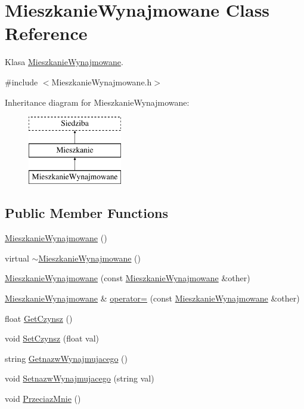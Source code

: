 \hypertarget{class_mieszkanie_wynajmowane}{}\section{Mieszkanie\+Wynajmowane Class Reference}
\label{class_mieszkanie_wynajmowane}


Klasa \hyperlink{class_mieszkanie_wynajmowane}{Mieszkanie\+Wynajmowane}.  




{\ttfamily \#include $<$Mieszkanie\+Wynajmowane.\+h$>$}

Inheritance diagram for Mieszkanie\+Wynajmowane\+:\begin{figure}[H]
\begin{center}
\leavevmode
\includegraphics[height=3.000000cm]{class_mieszkanie_wynajmowane}
\end{center}
\end{figure}
\subsection*{Public Member Functions}
\begin{DoxyCompactItemize}
\item 
\hyperlink{class_mieszkanie_wynajmowane_a8f23bf351540b25870d8816097e49c79}{Mieszkanie\+Wynajmowane} ()
\item 
virtual \hyperlink{class_mieszkanie_wynajmowane_ac08918efc1caebf86cb3eb54a8b14654}{$\sim$\+Mieszkanie\+Wynajmowane} ()
\item 
\hyperlink{class_mieszkanie_wynajmowane_a5f45599654f50e91e39f655aea84ccc3}{Mieszkanie\+Wynajmowane} (const \hyperlink{class_mieszkanie_wynajmowane}{Mieszkanie\+Wynajmowane} \&other)
\item 
\hyperlink{class_mieszkanie_wynajmowane}{Mieszkanie\+Wynajmowane} \& \hyperlink{class_mieszkanie_wynajmowane_a41c2c74090f7902b1277b5ec1b6fea4b}{operator=} (const \hyperlink{class_mieszkanie_wynajmowane}{Mieszkanie\+Wynajmowane} \&other)
\item 
float \hyperlink{class_mieszkanie_wynajmowane_af74eb718c87bc697522c3006d153464f}{Get\+Czynsz} ()
\item 
void \hyperlink{class_mieszkanie_wynajmowane_a54744a366a938cab96ae6e542e1770be}{Set\+Czynsz} (float val)
\item 
string \hyperlink{class_mieszkanie_wynajmowane_a8bdb7570f577836e8cf443ecccb23476}{Getnazw\+Wynajmujacego} ()
\item 
void \hyperlink{class_mieszkanie_wynajmowane_a964628ec1b2f577e7ea7c8de51b9426f}{Setnazw\+Wynajmujacego} (string val)
\item 
void \hyperlink{class_mieszkanie_wynajmowane_a1e7ec6bae620de2793c395b9a99feec8}{Przeciaz\+Mnie} ()
\end{DoxyCompactItemize}
